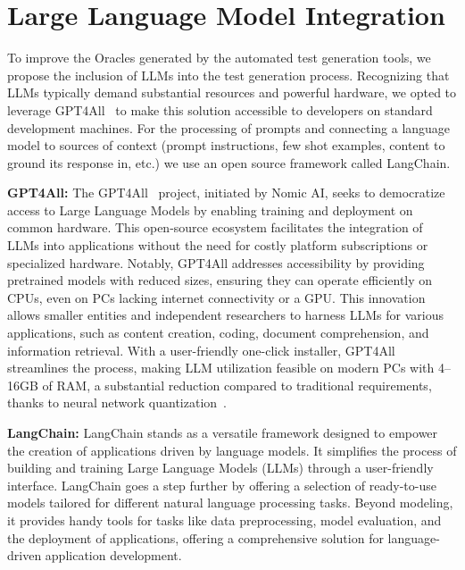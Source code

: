 \section{Large Language Model Integration}
\label{sec:llm_integration}
\vspace{0.2 cm}

To improve the Oracles generated by the automated test generation tools, we propose the inclusion of LLMs into the test generation process. Recognizing that LLMs typically demand substantial resources and powerful hardware, we opted to leverage GPT4All~\cite{noauthor_gpt4all_nodate} to make this solution accessible to developers on standard development machines. For the processing of prompts and connecting a language model to sources of context (prompt instructions, few shot examples, content to ground its response in, etc.) we use an open source framework called LangChain\cite{langchain}.

\textbf{GPT4All:} The GPT4All~\cite{noauthor_gpt4all_nodate} project, initiated by Nomic AI, seeks to democratize access to Large Language Models by enabling training and deployment on common hardware. This open-source ecosystem facilitates the integration of LLMs into applications without the need for costly platform subscriptions or specialized hardware. Notably, GPT4All addresses accessibility by providing pretrained models with reduced sizes, ensuring they can operate efficiently on CPUs, even on PCs lacking internet connectivity or a GPU. This innovation allows smaller entities and independent researchers to harness LLMs for various applications, such as content creation, coding, document comprehension, and information retrieval. With a user-friendly one-click installer, GPT4All streamlines the process, making LLM utilization feasible on modern PCs with 4–16GB of RAM, a substantial reduction compared to traditional requirements, thanks to neural network quantization~\cite{han_deep_2016}.

\textbf{LangChain:} LangChain\cite{langchain} stands as a versatile framework designed to empower the creation of applications driven by language models. It simplifies the process of building and training Large Language Models (LLMs) through a user-friendly interface. LangChain goes a step further by offering a selection of ready-to-use models tailored for different natural language processing tasks. Beyond modeling, it provides handy tools for tasks like data preprocessing, model evaluation, and the deployment of applications, offering a comprehensive solution for language-driven application development.

